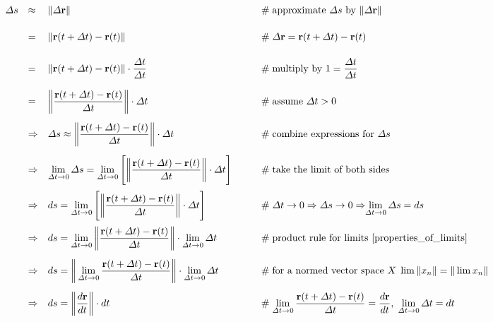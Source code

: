 \documentclass{article}
\theoremstyle{definition}
\begin{document}
\begin{equation*}
\begin{array}{lllll}
\Delta s
&\approx& \| \Delta \mathbf{r} \|							
			&\qquad \mathrel{\#} \text{approximate $\Delta s$ by $\| \Delta \mathbf{r} \|$} \\
[15pt]
&=& \| \mathbf{r}(t + \Delta t) - \mathbf{r}(t) \|		
			&\qquad \mathrel{\#} \Delta \mathbf{r}= \mathbf{r}(t + \Delta t) - \mathbf{r}(t) \\
[15pt]
&=& \| \mathbf{r}(t + \Delta t) - \mathbf{r}(t) \| \cdot \dfrac{\Delta t}{\Delta t} 
			&\qquad \mathrel{\#} \text{multiply by $1 = \dfrac{\Delta t}{\Delta t}$} \\
[15pt]
&=& \bigg \| \dfrac{\mathbf{r}(t + \Delta t) - \mathbf{r}(t)}{\Delta t} \bigg \| \cdot  \Delta t 
			&\qquad \mathrel{\#} \text{assume $\Delta t > 0$} \\
[15pt]
&\Rightarrow& \Delta s \approx \bigg \| \dfrac{\mathbf{r}(t + \Delta t) - 
			\mathbf{r}(t)}{\Delta t} \bigg \| \cdot  \Delta t
			&\qquad \mathrel{\#} \text{combine expressions for $\Delta s$} \\
[15pt]
&\Rightarrow& {\displaystyle \lim_{\Delta t \to 0} \Delta s =  \lim_{\Delta t \to 0} \Bigg [ 			
			\bigg \| \dfrac{\mathbf{r}(t + \Delta t) - \mathbf{r}(t)}{\Delta t} \bigg \| \cdot \Delta t} \Bigg ]
			&\qquad \mathrel{\#} \text{take the limit of both sides} \\
[15pt]
&\Rightarrow& {\displaystyle ds = \lim_{\Delta t \to 0} \Bigg  [ \bigg \| 			
			\dfrac{\mathbf{r}(t + \Delta t) - \mathbf{r}(t)}{\Delta t} \bigg \| \cdot \Delta t} \Bigg ] 
			&\qquad \mathrel{\#} \text{$\Delta t \to 0 \Rightarrow \Delta s \to 0 \Rightarrow \!\!
			{\displaystyle \lim_{\Delta t \to 0} \Delta s = ds}$} \\
[15pt]
&\Rightarrow& {\displaystyle ds = \lim_{\Delta t \to 0} \bigg \| 			
			\dfrac{\mathbf{r}(t + \Delta t) - \mathbf{r}(t)}{\Delta t} \bigg \|
			\cdot \lim_{\Delta t \to 0} \Delta t}
			&\qquad \mathrel{\#} \text{product rule for limits \cite{properties_of_limits}} \\
[15pt]
&\Rightarrow& {\displaystyle ds =  \bigg \| \lim_{\Delta t \to 0}			
			\dfrac{\mathbf{r}(t + \Delta t) - \mathbf{r}(t)}{\Delta t} \bigg \|
			\cdot \lim_{\Delta t \to 0} \Delta t}
			&\qquad \mathrel{\#} \text{for a normed vector space ${\displaystyle X \; \lim \|x_n\| = \|\lim x_n \|}$} \\
[15pt]
&\Rightarrow& ds = \bigg \| \dfrac{d\mathbf{r}}{dt} \bigg \| \cdot dt
			&\qquad \mathrel{\#} {\displaystyle \lim_{\Delta t \to 0}			
			\dfrac{\mathbf{r}(t + \Delta t) - \mathbf{r}(t)}{\Delta t} = \dfrac{d\mathbf{r}}{dt},
			\; \lim_{\Delta t \to 0} \Delta t} = dt
\end{array}
\end{equation*}
\end{document}
